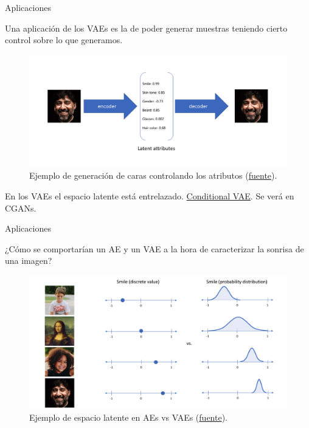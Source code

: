 \begin{frame}{Aplicaciones}

Una aplicación de los VAEs es la de poder generar muestras teniendo \alert{cierto} control sobre lo que generamos.

\begin{figure}
    \centering
    \includegraphics[width=.7\textwidth]{Slides/figures/02_Metodos_Generativos/vae-face-generator.png}
    \caption{Ejemplo de generación de caras controlando los atributos (\href{https://www.jeremyjordan.me/variational-autoencoders/}{fuente}).}
    \label{fig:enter-label}
\end{figure}

En los VAEs el espacio latente está \alert{entrelazado}. \href{https://github.com/nnormandin/Conditional_VAE/blob/master/Conditional_VAE.ipynb}{Conditional VAE}. Se verá en CGANs.
    
\end{frame}

\begin{frame}{Aplicaciones}

¿Cómo se comportarían un AE y un VAE a la hora de caracterizar la sonrisa de una imagen?

\begin{figure}
    \centering
    \includegraphics[width=.7\textwidth]{Slides/figures/02_Metodos_Generativos/vae-face-generator-smile.png}
    \caption{Ejemplo de espacio latente en AEs vs VAEs (\href{https://www.jeremyjordan.me/variational-autoencoders/}{fuente}).}
    \label{fig:enter-label}
\end{figure}
    
\end{frame}

